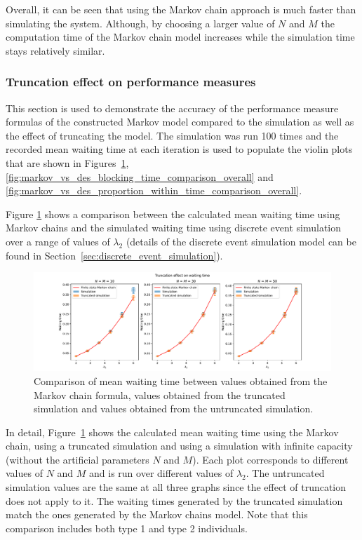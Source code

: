 Overall, it can be seen that using the Markov chain approach is much faster than
simulating the system.
Although, by choosing a larger value of \(N\) and \(M\) the computation time of
the Markov chain model increases while the simulation time stays relatively 
similar.

\subsubsection{Truncation effect on performance measures}

This section is used to demonstrate the accuracy of the performance measure
formulas of the constructed Markov model compared to the simulation as well as
the effect of truncating the model.
The simulation was run 100 times and the recorded mean waiting time at each
iteration is used to populate the violin plots that are shown in
Figures~\ref{fig:markov_vs_des_waiting_time_comparison_overall},
\ref{fig:markov_vs_des_blocking_time_comparison_overall} and
\ref{fig:markov_vs_des_proportion_within_time_comparison_overall}.

Figure \ref{fig:markov_vs_des_waiting_time_comparison_overall} shows a 
comparison between the calculated mean waiting time using Markov chains and the
simulated waiting time using discrete event simulation over a range of values of 
\(\lambda_2\) (details of the discrete event simulation model can be found in 
Section~\ref{sec:discrete_event_simulation}).

\begin{figure}[H]
    \includegraphics[width=\textwidth]{chapters/03_queueing_model/img/numeric_results_and_timings/truncation_effect/waiting/demo.pdf}
    \caption{
        Comparison of mean waiting time between values obtained from the Markov 
        chain formula, values obtained from the truncated simulation and values
        obtained from the untruncated simulation.
    }
    \label{fig:markov_vs_des_waiting_time_comparison_overall}
\end{figure}

In detail, Figure~\ref{fig:markov_vs_des_waiting_time_comparison_overall} shows
the calculated mean waiting time using the Markov chain, using a truncated 
simulation and using a simulation with infinite capacity (without the artificial
parameters \(N\) and \(M\)).
Each plot corresponds to different values of \(N\) and \(M\) and is run over 
different values of \(\lambda_2\).
The untruncated simulation values are the same at all three graphs since
the effect of truncation does not apply to it.
The waiting times generated by the truncated simulation match the ones generated 
by the Markov chains model.
Note that this comparison includes both type 1 and type 2 individuals.


